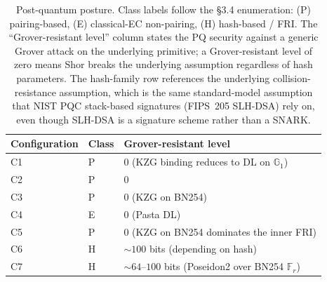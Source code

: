 \begin{table}[t]
  \centering
  \caption{Post-quantum posture. Class labels follow the §3.4
    enumeration: (P) pairing-based, (E) classical-EC non-pairing,
    (H) hash-based / FRI. The ``Grover-resistant level'' column
    states the PQ security against a generic Grover attack on the
    underlying primitive; a Grover-resistant level of zero means
    Shor breaks the underlying assumption regardless of hash
    parameters. The hash-family row references the underlying
    collision-resistance assumption, which is the same
    standard-model assumption that
    NIST PQC stack-based signatures (FIPS~205 SLH-DSA) rely on,
    even though SLH-DSA is a signature scheme rather than a SNARK.}
  \label{tab:pq}
  \begin{tabular}{lll}
    \toprule
    Configuration & Class & Grover-resistant level \\
    \midrule
    C1  & P  & 0 (KZG binding reduces to DL on $\mathbb{G}_1$) \\
    C2  & P  & 0 \\
    C3  & P  & 0 (KZG on BN254) \\
    C4  & E  & 0 (Pasta DL) \\
    C5  & P  & 0 (KZG on BN254 dominates the inner FRI) \\
    C6  & H  & ${\sim}100$ bits (depending on hash) \\
    C7  & H  & ${\sim}64$--$100$ bits (Poseidon2 over BN254 $\mathbb{F}_r$) \\
    \bottomrule
  \end{tabular}
\end{table}
